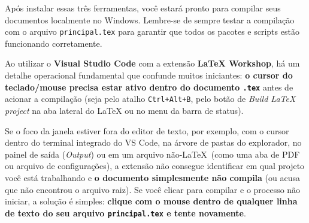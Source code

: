 \documentclass[a4paper,12pt]{article}
\begin{document}
Após instalar essas três ferramentas, você estará pronto para compilar seus documentos localmente no Windows. Lembre-se de sempre testar a compilação com o arquivo \texttt{principal.tex} para garantir que todos os pacotes e scripts estão funcionando corretamente.

\begin{atencao}
Ao utilizar o \textbf{Visual Studio Code} com a extensão \textbf{LaTeX Workshop}, há um detalhe operacional fundamental que confunde muitos iniciantes: \textbf{o cursor do teclado/mouse precisa estar ativo dentro do documento \texttt{.tex}} antes de acionar a compilação (seja pelo atalho \texttt{Ctrl+Alt+B}, pelo botão de \textit{Build LaTeX project} na aba lateral do LaTeX ou no menu da barra de status).

Se o foco da janela estiver fora do editor de texto, por exemplo, com o cursor dentro do terminal integrado do VS Code, na árvore de pastas do explorador, no painel de saída (\textit{Output}) ou em um arquivo não-\LaTeX \ (como uma aba de PDF ou arquivo de configurações), a extensão não consegue identificar em qual projeto você está trabalhando e \textbf{o documento simplesmente não compila} (ou acusa que não encontrou o arquivo raiz). Se você clicar para compilar e o processo não iniciar, a solução é simples: \textbf{clique com o mouse dentro de qualquer linha de texto do seu arquivo \texttt{principal.tex} e tente novamente}.
\end{atencao}
\end{document}
